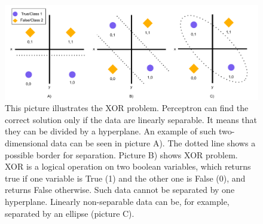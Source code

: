 \begin{figure}[H]
\centering
\includegraphics[width=1\columnwidth]{../img/xor}
\caption[The XOR problem illustration]{This picture illustrates the XOR problem. Perceptron can find the correct solution only if the data are linearly separable. It means that they can be divided by a hyperplane. An example of such two-dimensional data can be seen in picture A). The dotted line shows a possible border for separation. Picture B) shows XOR problem. XOR is a logical operation on two boolean variables, which returns true if one variable is True (1) and the other one is False (0), and returns False otherwise. Such data cannot be separated by one hyperplane. Linearly non-separable data can be, for example, separated by an ellipse (picture C).}
\label{pic:xor}
\end{figure}

